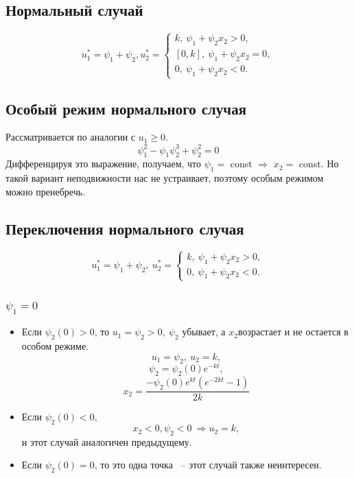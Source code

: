 \documentclass[12pt, fleqn]{article}
\begin{document}
\subsection{Нормальный случай}
$$
u_1^* = 
\psi_1 + \psi_2, 
u_2^* =  \begin{cases}
k, \ \psi_1 + \psi_2x_2 > 0,\\

[0, k], \ \psi_1 + \psi_2x_2 = 0, \\
0, \ \psi_1 + \psi_2x_2 < 0.
\end{cases}
$$
\subsection{Особый режим нормального случая}
Рассматривается по аналогии с $u_1 \geqslant 0$.
\begin{equation}
\psi_1^2 - \psi_1\psi_2^3 + \psi_2^2 = 0
\end{equation}
Дифференцируя это выражение, получаем, что $\psi_1 = $ const $\Rightarrow$ $x_2 =$  const. Но такой вариант неподвижности нас не устраивает, поэтому особым режимом можно пренебречь.
\subsection{Переключения нормального случая}
$$
u_1^* = 
\psi_1 + \psi_2, \ 
u_2^* =  \begin{cases}
k, \ \psi_1 + \psi_2x_2 > 0,\\
0, \ \psi_1 + \psi_2x_2 < 0.
\end{cases}
$$
\subsubsection{$\psi_1 = 0$}
\begin{itemize}
\item
Если $\psi_2(0) > 0$, то $u_1 = \psi_2 > 0, \ \psi_2$ убывает, а $x_2$возрастает и не остается в особом режиме.
\begin{equation}
u_1 = \psi_2, \ u_2 = k,
\end{equation}
\begin{equation}
\psi_2 = \psi_2(0)e^{-kt},
\end{equation}
\begin{equation}
x_2 = \frac{-\psi_2(0)e^{kt}(e^{-2kt} - 1)}{2k}
\end{equation}
\item
Если $\psi_2(0) < 0$, 
\begin{equation}
x_2 < 0, \psi_2 < 0 \ \Rightarrow u_2 = k,
\end{equation}
и этот случай аналогичен предыдущему.

\item
Если $\psi_2(0) = 0$, то это одна точка ~-- этот случай также неинтересен.
\end{itemize}
\end{document}
